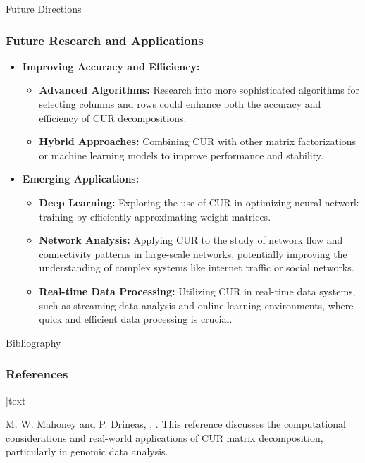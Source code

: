\documentclass[pdf]{beamer}
\begin{document}
\begin{frame}{Future Directions}
    \frametitle{Future Research and Applications}
    \begin{itemize}
        \item \textbf{Improving Accuracy and Efficiency:}
            \begin{itemize}
                \item \textbf{Advanced Algorithms:} Research into more sophisticated algorithms for selecting columns and rows could enhance both the accuracy and efficiency of CUR decompositions.
                \item \textbf{Hybrid Approaches:} Combining CUR with other matrix factorizations or machine learning models to improve performance and stability.
            \end{itemize}
        \item \textbf{Emerging Applications:}
            \begin{itemize}
                \item \textbf{Deep Learning:} Exploring the use of CUR in optimizing neural network training by efficiently approximating weight matrices.
                \item \textbf{Network Analysis:} Applying CUR to the study of network flow and connectivity patterns in large-scale networks, potentially improving the understanding of complex systems like internet traffic or social networks.
                \item \textbf{Real-time Data Processing:} Utilizing CUR in real-time data systems, such as streaming data analysis and online learning environments, where quick and efficient data processing is crucial.
            \end{itemize}
    \end{itemize}
\end{frame}

\begin{frame}{Bibliography}
    \frametitle{References}
    \begin{thebibliography}{10} %
        [text]
        
        M. W. Mahoney and P. Drineas,
        ,
        .
        \newblock This reference discusses the computational considerations and real-world applications of CUR matrix decomposition, particularly in genomic data analysis.
        
    \end{thebibliography}
\end{frame}
\end{document}
